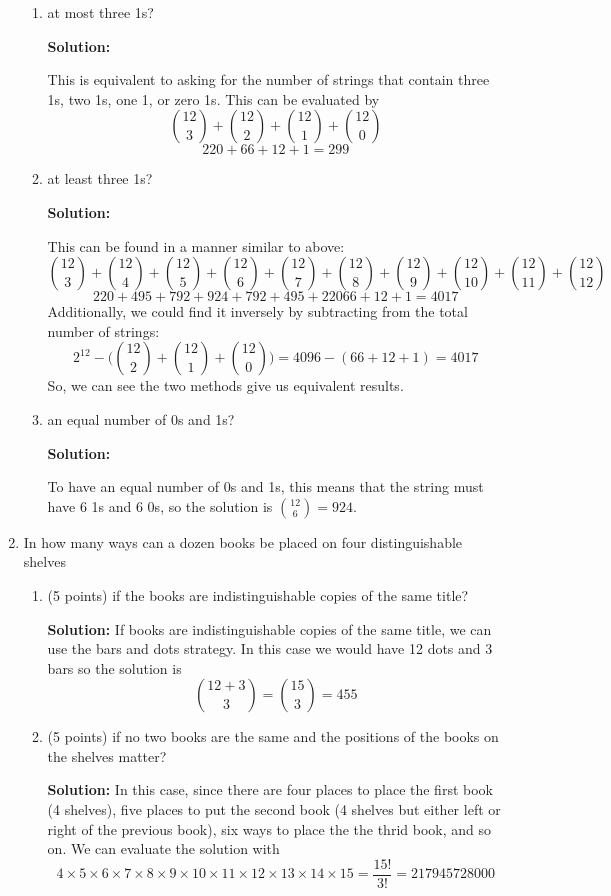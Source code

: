 \documentclass[11pt]{article}
\begin{document}
\begin{enumerate}
\begin{enumerate}
\item at most three 1s? 

\textbf{Solution: }

This is equivalent to asking for the number of strings that contain three 1s, two 1s, one 1, or zero 1s.  This can be evaluated by
$$ {12 \choose 3} + {12 \choose 2} + {12 \choose 1} + {12 \choose 0} $$
$$ 220 + 66 + 12 + 1 = 299 $$

\item at least three 1s? 

\textbf{Solution: }

This can be found in a manner similar to above:
$$ {12 \choose 3} + {12 \choose 4} + {12 \choose 5} + {12 \choose 6} + {12 \choose 7} + {12 \choose 8} + {12 \choose 9} + {12 \choose 10} + {12 \choose 11} + {12 \choose 12} $$
$$ 220 + 495 + 792 + 924 + 792 + 495 + 220 66 + 12 + 1 = 4017 $$
Additionally, we could find it inversely by subtracting from the total number of strings:
$$ 2^{12} - \bigg( {12 \choose 2} + {12 \choose 1} + {12 \choose 0} \bigg) = 4096 - (66 + 12 + 1) = 4017 $$
So, we can see the two methods give us equivalent results.  

\item an equal number of 0s and 1s? 

\textbf{Solution: }

To have an equal number of 0s and 1s, this means that the string must have $6$ 1s and $6$ 0s, so the solution is ${12 \choose 6} = 924$.  
\end{enumerate}

\item In how many ways can a dozen books be placed on four distinguishable shelves
\begin{enumerate}
\item (5 points) if the books are indistinguishable copies of the same title?

\textbf{Solution: }
If books are indistinguishable copies of the same title, we can use the bars and dots strategy.  In this case we would have 12 dots and 3 bars so the solution is 
$$ {12 + 3 \choose 3} = {15 \choose 3} = 455 $$

\item (5 points) if no two books are the same and the positions of the books on the shelves matter?

\textbf{Solution: }
In this case, since there are four places to place the first book (4 shelves), five places to put the second book (4 shelves but either left or right of the previous book), six ways to place the the thrid book, and so on.  We can evaluate the solution with
$$ 4 \times 5 \times 6 \times 7 \times 8 \times 9 \times 10 \times 11 \times 12 \times 13 \times 14 \times 15 = \dfrac{15!}{3!} = 217945728000 $$


\end{enumerate}
\end{enumerate}
\end{document}
